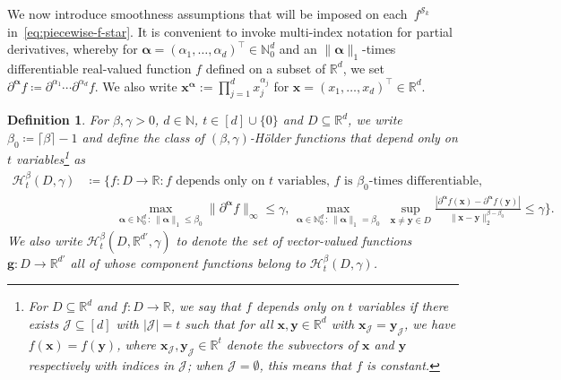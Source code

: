 \documentclass[12pt]{article}
\newtheorem{defn}{Definition}
\begin{document}
We now introduce smoothness assumptions that will be imposed on each~$f^{\mathcal{S}_k}$ in~\eqref{eq:piecewise-f-star}.    
It is convenient to invoke multi-index notation for partial derivatives, whereby for $\bm\alpha=(\alpha_1,\ldots,\alpha_d)^\top \in \mathbb{N}_0^d$ and an $\|\bm\alpha\|_1$-times differentiable real-valued function $f$ defined on a subset of $\mathbb{R}^d$, we set $\partial^{\bm\alpha}f \coloneqq \partial^{\alpha_1}\cdots\partial^{\alpha_d}f$.  We also write $\bm{x}^{\bm{\alpha}} := \prod_{j=1}^d x_j^{\alpha_j}$ for $\bm{x} = (x_1,\ldots,x_d)^\top \in \mathbb{R}^d$.
\begin{defn}
    For $\beta,\gamma>0$, $d\in\mathbb{N}$, $t\in[d] \cup \{0\}$ and $D\subseteq \mathbb{R}^d$, we write $\beta_0 \coloneqq \lceil \beta \rceil -1$ and define the class of $(\beta,\gamma)$-H\"older functions that depend only on $t$ variables\footnote{For $D \subseteq \mathbb{R}^d$ and $f:D \to \mathbb{R}$, we say that $f$ \emph{depends only on $t$ variables} if there exists $\mathcal{J} \subseteq [d]$ with $|\mathcal{J}| = t$ such that for all $\bm{x}, \bm{y} \in \mathbb{R}^d$ with $\bm{x}_{\mathcal{J}} = \bm{y}_{\mathcal{J}}$, we have $f(\bm{x}) = f(\bm{y})$, where $\bm x_{\mathcal{J}}, \bm{y}_{\mathcal{J}} \in \mathbb{R}^t$ denote the subvectors of $\bm x$ and $\bm y$ respectively with indices in $\mathcal{J}$; when $\mathcal{J} = \emptyset$, this means that $f$ is constant.} as
    \begin{align*}
        \mathcal{H}_t^{\beta}(D,\gamma) &\coloneqq \biggl\{ f:D\to\mathbb{R} : \text{$f$ depends only on $t$ variables, $f$ is $\beta_0$-times differentiable,}\\
        &\hspace{1cm}\max_{\bm \alpha\in\mathbb{N}_0^d \,:\, \|\bm\alpha\|_1 \leq \beta_0} \|\partial^{\bm\alpha} f\|_{\infty} \leq \gamma,\, \max_{\bm\alpha\in\mathbb{N}_0^d \,:\, \|\bm\alpha\|_1 = \beta_0}\; \sup_{\bm x\neq \bm y \in D} \frac{|\partial^{\bm\alpha} f(\bm x) - \partial^{\bm\alpha} f(\bm y)|}{\|\bm x-\bm y\|_{2}^{\beta-\beta_0}} \leq \gamma \biggr\}.
    \end{align*}
    We also write $\mathcal{H}_t^\beta(D,\mathbb{R}^{d'},\gamma)$ to denote the set of vector-valued functions $\bm g:D \rightarrow \mathbb{R}^{d'}$ all of whose component functions belong to $\mathcal{H}_t^\beta(D,\gamma)$.
\end{defn}
\end{document}
